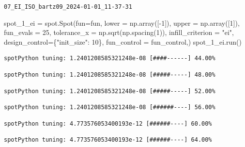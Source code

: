 \documentclass[
  letterpaper,
  DIV=11,
  numbers=noendperiod]{scrreprt}
\newenvironment{Shaded}{\begin{snugshade}}{\end{snugshade}}
\newcommand{\DecValTok}[1]{\textcolor[rgb]{0.68,0.00,0.00}{#1}}
\newcommand{\NormalTok}[1]{\textcolor[rgb]{0.00,0.23,0.31}{#1}}
\newcommand{\OperatorTok}[1]{\textcolor[rgb]{0.37,0.37,0.37}{#1}}
\newcommand{\StringTok}[1]{\textcolor[rgb]{0.13,0.47,0.30}{#1}}
\begin{document}
\begin{verbatim}
07_EI_ISO_bartz09_2024-01-01_11-37-31
\end{verbatim}

\begin{Shaded}
\begin{Highlighting}[]
\NormalTok{spot\_1\_ei }\OperatorTok{=}\NormalTok{ spot.Spot(fun}\OperatorTok{=}\NormalTok{fun,}
\NormalTok{                   lower }\OperatorTok{=}\NormalTok{ np.array([}\OperatorTok{{-}}\DecValTok{1}\NormalTok{]),}
\NormalTok{                   upper }\OperatorTok{=}\NormalTok{ np.array([}\DecValTok{1}\NormalTok{]),}
\NormalTok{                   fun\_evals }\OperatorTok{=} \DecValTok{25}\NormalTok{,}
\NormalTok{                   tolerance\_x }\OperatorTok{=}\NormalTok{ np.sqrt(np.spacing(}\DecValTok{1}\NormalTok{)),}
\NormalTok{                   infill\_criterion }\OperatorTok{=} \StringTok{"ei"}\NormalTok{,}
\NormalTok{                   design\_control}\OperatorTok{=}\NormalTok{\{}\StringTok{"init\_size"}\NormalTok{: }\DecValTok{10}\NormalTok{\},}
\NormalTok{                   fun\_control }\OperatorTok{=}\NormalTok{ fun\_control,)}
\NormalTok{spot\_1\_ei.run()}
\end{Highlighting}
\end{Shaded}

\begin{verbatim}
spotPython tuning: 1.2401208585321248e-08 [####------] 44.00% 
\end{verbatim}

\begin{verbatim}
spotPython tuning: 1.2401208585321248e-08 [#####-----] 48.00% 
\end{verbatim}

\begin{verbatim}
spotPython tuning: 1.2401208585321248e-08 [#####-----] 52.00% 
\end{verbatim}

\begin{verbatim}
spotPython tuning: 1.2401208585321248e-08 [######----] 56.00% 
\end{verbatim}

\begin{verbatim}
spotPython tuning: 4.773576053400193e-12 [######----] 60.00% 
\end{verbatim}

\begin{verbatim}
spotPython tuning: 4.773576053400193e-12 [######----] 64.00% 
\end{verbatim}
\end{document}
